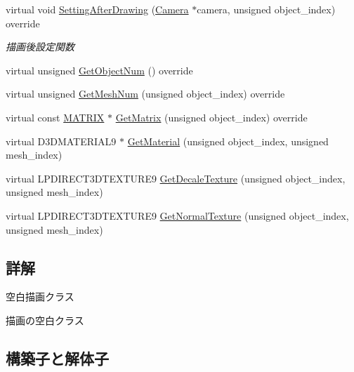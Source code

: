 \begin{DoxyCompactItemize}
virtual void \mbox{\hyperlink{class_draw_null_a76edfc5af0bf3275f96f40394aff8510}{Setting\+After\+Drawing}} (\mbox{\hyperlink{class_camera}{Camera}} $\ast$camera, unsigned object\+\_\+index) override
\begin{DoxyCompactList}\small\item\em 描画後設定関数 \end{DoxyCompactList}\item 
virtual unsigned \mbox{\hyperlink{class_draw_null_aaffa15d184f1d09512ccaa3bdad3f658}{Get\+Object\+Num}} () override
\item 
virtual unsigned \mbox{\hyperlink{class_draw_null_ad735978a85a5f3583eecd82d6bfe6413}{Get\+Mesh\+Num}} (unsigned object\+\_\+index) override
\item 
virtual const \mbox{\hyperlink{_vector3_d_8h_a032295cd9fb1b711757c90667278e744}{M\+A\+T\+R\+IX}} $\ast$ \mbox{\hyperlink{class_draw_null_adede079e9c11a756090740b20bb43022}{Get\+Matrix}} (unsigned object\+\_\+index) override
\item 
virtual D3\+D\+M\+A\+T\+E\+R\+I\+A\+L9 $\ast$ \mbox{\hyperlink{class_draw_null_a84969d22d3436986f214e9896fe44fc6}{Get\+Material}} (unsigned object\+\_\+index, unsigned mesh\+\_\+index)
\item 
virtual L\+P\+D\+I\+R\+E\+C\+T3\+D\+T\+E\+X\+T\+U\+R\+E9 \mbox{\hyperlink{class_draw_null_a8496ed1b1f765a331a8f1704122b8ca4}{Get\+Decale\+Texture}} (unsigned object\+\_\+index, unsigned mesh\+\_\+index)
\item 
virtual L\+P\+D\+I\+R\+E\+C\+T3\+D\+T\+E\+X\+T\+U\+R\+E9 \mbox{\hyperlink{class_draw_null_a41b7d148612b2d328e85289e32dc374c}{Get\+Normal\+Texture}} (unsigned object\+\_\+index, unsigned mesh\+\_\+index)
\end{DoxyCompactItemize}


\subsection{詳解}
空白描画クラス 

描画の空白クラス 

\subsection{構築子と解体子}
\mbox{\label{class_draw_null_aa085e175e9e05fc56cb4aefa2d07f371}} 
